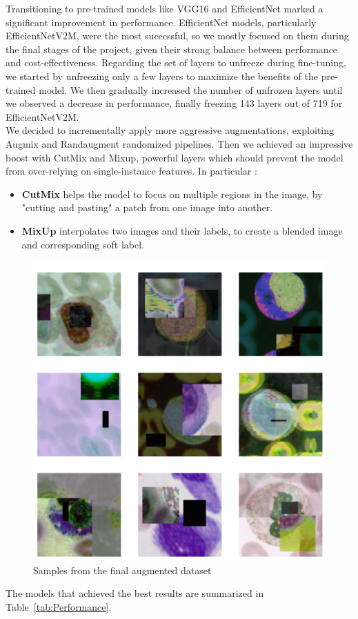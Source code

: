 \documentclass[11pt]{article}
\begin{document}
\begin{multicols}{2}
    Transitioning to pre-trained models like VGG16 and EfficientNet marked a significant improvement in performance. EfficientNet models, particularly EfficientNetV2M, were the most successful, so we mostly focused on them during the final stages of the project, given their strong balance between performance and cost-effectiveness.
    Regarding the set of layers to unfreeze during fine-tuning, we started by unfreezing only a few layers to maximize the benefits of the pre-trained model. We then gradually increased the number of unfrozen layers until we observed a decrease in performance, finally freezing 143 layers out of 719 for EfficientNetV2M.\\
    We decided to incrementally apply more aggressive augmentations, exploiting Augmix and Randaugment randomized pipelines. Then we achieved an impressive boost with CutMix and Mixup, powerful layers which should prevent the model from over-relying on single-instance features. In particular :
    \begin{itemize}
        \item \textbf{CutMix} helps the model to focus on multiple regions in the image, by "cutting and pasting" a patch from one image into another.
        \item \textbf{MixUp} interpolates two images and their labels, to create a blended image and corresponding soft label.
    \end{itemize}
    \begin{figure}[H]
        \centering
        \includegraphics[width=0.50\linewidth]{augmented_sample.png}
        \caption{Samples from the final augmented dataset}
        \label{fig:noise}
    \end{figure}
    The models that achieved the best results are summarized in Table~\ref{tab:Performance}.\\
    \begin{table}[t]

\end{table}
\end{multicols}
\end{document}
